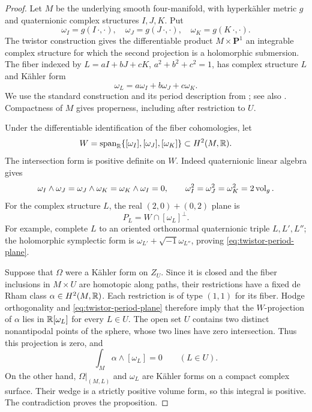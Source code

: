 \documentclass[11pt,a4paper]{article}
\numberwithin{equation}{section}
\theoremstyle{definition}
\theoremstyle{remark}
\newcommand{\PP}{\mathbf P}\newcommand{\HH}{\mathbb H}
\begin{document}
\begin{proof}
Let $M$ be the underlying smooth four-manifold, with hyperkähler
metric $g$ and quaternionic complex structures $I,J,K$. Put
\[
 \omega_I=g(I\,\cdot,\cdot),\quad
 \omega_J=g(J\,\cdot,\cdot),\quad
 \omega_K=g(K\,\cdot,\cdot).
\]
The twistor construction gives the differentiable product
$M\times\PP^1$ an integrable complex structure for which the second
projection is a holomorphic submersion. The fiber indexed by
$L=aI+bJ+cK$, $a^2+b^2+c^2=1$, has complex structure $L$ and Kähler
form
\[
 \omega_L=a\omega_I+b\omega_J+c\omega_K.
\]
We use the standard construction and its period description from
\cite[Chapter~7, Section~3.2]{Huybrechts2016}; see also
\cite[Section~1.3]{Huybrechts2023}. Compactness of $M$ gives
properness, including after restriction to $U$.

Under the differentiable identification of the fiber cohomologies,
let
\[
 W=\operatorname{span}_{\mathbb R}
   \{[\omega_I],[\omega_J],[\omega_K]\}\subset H^2(M,\mathbb R).
\]
The intersection form is positive definite on $W$. Indeed
quaternionic linear algebra gives
\[
 \omega_I\wedge\omega_J
 =\omega_J\wedge\omega_K
 =\omega_K\wedge\omega_I=0,
 \qquad
 \omega_I^2=\omega_J^2=\omega_K^2=2\operatorname{vol}_g.
\]
For the complex structure $L$, the real $(2,0)+(0,2)$ plane is
\begin{equation}\label{eq:twistor-period-plane}
 P_L=W\cap[\omega_L]^\perp.
\end{equation}
For example, complete $L$ to an oriented orthonormal quaternionic
triple $L,L',L''$; the holomorphic symplectic form is
$\omega_{L'}+\sqrt{-1}\omega_{L''}$, proving
\eqref{eq:twistor-period-plane}.

Suppose that $\Omega$ were a Kähler form on $Z_U$. Since it is
closed and the fiber inclusions in $M\times U$ are homotopic along
paths, their restrictions have a fixed de Rham class
$\alpha\in H^2(M,\mathbb R)$. Each restriction is of type $(1,1)$ for its
fiber. Hodge orthogonality and \eqref{eq:twistor-period-plane}
therefore imply that the $W$-projection of $\alpha$ lies in
$\mathbb R[\omega_L]$ for every $L\in U$. The open set $U$ contains two
distinct nonantipodal points of the sphere, whose two lines have
zero intersection. Thus this projection is zero, and
\[
 \int_M\alpha\wedge[\omega_L]=0\qquad(L\in U).
\]
On the other hand, $\Omega|_{(M,L)}$ and $\omega_L$ are Kähler forms
on a compact complex surface. Their wedge is a strictly positive
volume form, so this integral is positive. The contradiction proves
the proposition.
\end{proof}
\end{document}
